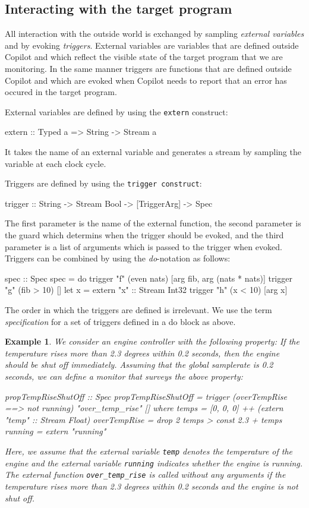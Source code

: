 \documentclass[a4paper, 10pt]{article}
\theoremstyle{example}
\newtheorem{example}{Example}%
\begin{document}
\subsection{Interacting with the target program}

All interaction with the outside world is exchanged by sampling \emph{external
variables} and by evoking \emph{triggers}.
External variables are variables that are defined outside Copilot and which
reflect the visible state of the target program that we are monitoring.
In the same manner triggers are functions that are defined outside Copilot and which
are evoked when Copilot needs to report that an error has occured in the target program.

External variables are defined by using the {\tt extern} construct:
%
\begin{code}
extern :: Typed a => String -> Stream a
\end{code}
%
It takes the name of an external variable and generates a stream by sampling
the variable at each clock cycle. 

Triggers are defined by using the {\tt trigger construct}:
%
\begin{code}
trigger :: String -> Stream Bool -> [TriggerArg] -> Spec
\end{code}
%
The first parameter is the name of the external function, the second parameter is the
guard which determins when the trigger should be evoked, and the third parameter
is a list of arguments which is passed to the trigger when evoked.
Triggers can be combined by using the \emph{do}-notation as follows:
%
\begin{code}
spec :: Spec
spec =
  do
    trigger "f" (even nats) [arg fib, arg (nats * nats)]
    trigger "g" (fib > 10) []
    let x = extern "x" :: Stream Int32
    trigger "h" (x < 10) [arg x]
\end{code}
%
The order in which the triggers are defined is irrelevant.
We use the term \emph{specification} for a set of triggers defined in a do
block as above.

\begin{example}
We consider an engine controller with the following property:
If the temperature rises more than 2.3 degrees within 0.2 seconds, then
the engine should be shut off immediately.
Assuming that the global samplerate is 0.2 seconds, we can define a monitor that
surveys the above property:
%
\begin{code}
propTempRiseShutOff :: Spec
propTempRiseShutOff = trigger (overTempRise ==> not running) "over_temp_rise" []
  where
    temps        = [0, 0, 0] ++ (extern "temp" :: Stream Float)
    overTempRise = drop 2 temps > const 2.3 + temps
    running      = extern "running"

\end{code}
%
Here, we assume that the external variable {\tt temp} denotes the temperature of the
engine and the external variable {\tt running} indicates whether the engine is running.
The external function {\tt over\_temp\_rise} is called without any arguments if the
temperature rises more than 2.3 degrees within 0.2 seconds and the engine is not shut
off.
\end{example}
\end{document}
